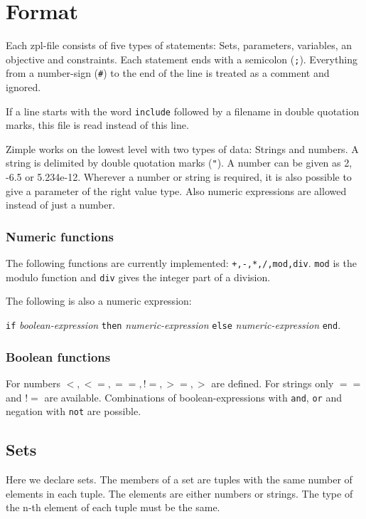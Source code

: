\documentclass[12pt]{article}
\newcommand{\zimple}{{\sc Zimple}\xspace}
\newcommand{\zpl}{{\sc zpl}\xspace}
\newcommand{\code}[1]{{\tt #1}\xspace}
\begin{document}
\section{Format}

Each \zpl-file consists of five types of statements: Sets, parameters,
variables, an objective and constraints.
Each statement ends with a semicolon (\code{;}). 
Everything from a number-sign (\code{\#}) to 
the end of the line is treated as a
comment and ignored.

If a line starts with the word \code{include} followed by a filename in double
quotation marks, this file is read instead of this line.

\zimple works on the lowest level with two types of data: Strings and
numbers. A string is delimited by double quotation marks (\code{"}).
A number can be given as 2, -6.5 or 5.234e-12. 
Wherever a number or string is required, it is also possible to give a
parameter of the right value type. Also numeric expressions are
allowed instead of just a number. 

\subsubsection{Numeric functions}
The following functions are currently implemented: 
\code{+,-,*,/,mod,div}. \code{mod} is the modulo function and
\code{div} gives the integer part of a division.

\medskip
The following is also a numeric expression:

\code{if} \emph{boolean-expression} \code{then}
\emph{numeric-expression} \code{else} \emph{numeric-expression} \code{end}.

\subsubsection{Boolean functions}
For numbers $<,<=,==,!=,>=,>$ are defined. For strings only $==$ and
$!=$ are available. Combinations of boolean-expressions with \code{and},
\code{or} and negation with \code{not} are possible.

\subsection{Sets}
Here we declare sets. The members of a set are tuples with the same
number of elements in each tuple. 
The elements are either numbers or strings. The type of the n-th
element of each tuple must be the same.
\end{document}
